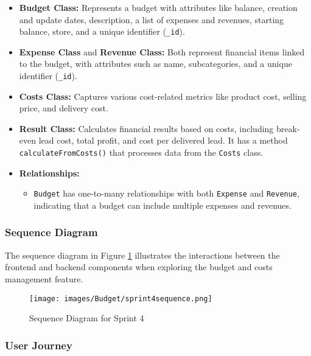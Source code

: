 \begin{itemize}
    \item \textbf{Budget Class:} Represents a budget with attributes like balance, creation and update dates, description, a list of expenses and revenues, starting balance, store, and a unique identifier (\texttt{\_id}).
    
    \item \textbf{Expense Class} and \textbf{Revenue Class:} Both represent financial items linked to the budget, with attributes such as name, subcategories, and a unique identifier (\texttt{\_id}).

    \item \textbf{Costs Class:} Captures various cost-related metrics like product cost, selling price, and delivery cost.

    \item \textbf{Result Class:} Calculates financial results based on costs, including break-even lead cost, total profit, and cost per delivered lead. It has a method \texttt{calculateFromCosts()} that processes data from the \texttt{Costs} class.
    
    \item \textbf{Relationships:}
    \begin{itemize}
        \item \texttt{Budget} has one-to-many relationships with both \texttt{Expense} and \texttt{Revenue}, indicating that a budget can include multiple expenses and revenues.
    \end{itemize}
\end{itemize}

\subsubsection{Sequence Diagram}

The sequence diagram in Figure \ref{fig:sequence_sprint4} illustrates the interactions between the frontend and backend components when exploring the budget and costs management feature.

\begin{figure}[H]
    \centering
    \texttt{[image: images/Budget/sprint4sequence.png]}
    \caption{Sequence Diagram for Sprint 4}
    \label{fig:sequence_sprint4}
\end{figure}

\subsubsection{User Journey}


